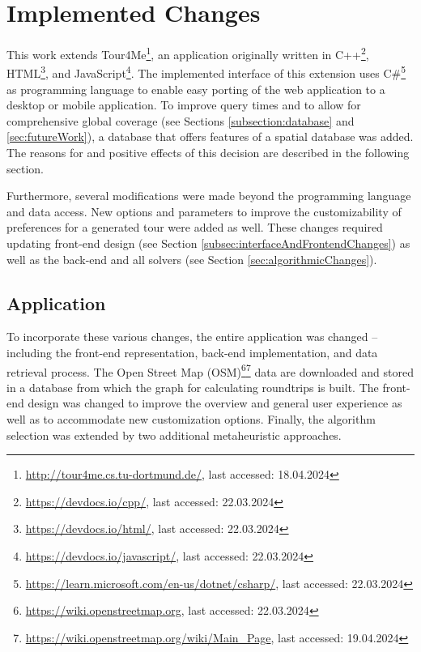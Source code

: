 \chapter{Implemented Changes}
\label{chapter:implementedChanges}

This work extends Tour4Me\footnote{\url{http://tour4me.cs.tu-dortmund.de/}, last accessed: 18.04.2024}, an application originally written in C++\footnote{\url{https://devdocs.io/cpp/}, last accessed: 22.03.2024}, HTML\footnote{\url{https://devdocs.io/html/}, last accessed: 22.03.2024}, and JavaScript\footnote{\url{https://devdocs.io/javascript/}, last accessed: 22.03.2024}. 
The implemented interface of this extension uses C\#\footnote{\url{https://learn.microsoft.com/en-us/dotnet/csharp/}, last accessed: 22.03.2024} as programming language to enable easy porting of the web application to a desktop or mobile application.
To improve query times and to allow for comprehensive global coverage (see Sections \ref{subsection:database} and \ref{sec:futureWork}), a database that offers features of a spatial database was added. 
The reasons for and positive effects of this decision are described in the following section.

Furthermore, several modifications were made beyond the programming language and data access.
New options and parameters to improve the customizability of preferences for a generated tour were added as well.
These changes required updating front-end design (see Section \ref{subsec:interfaceAndFrontendChanges}) as well as the back-end and all solvers (see Section \ref{sec:algorithmicChanges}). 


\section{Application}
\label{sec:application}

To incorporate these various changes, the entire application was changed -- including the front-end representation, back-end implementation, and data retrieval process.
The Open Street Map (OSM)\footnote{\url{https://wiki.openstreetmap.org}, last accessed: 22.03.2024}\footnote{\url{https://wiki.openstreetmap.org/wiki/Main_Page}, last accessed: 19.04.2024} data are downloaded and stored in a database from which the graph for calculating roundtrips is built.
The front-end design was changed to improve the overview and general user experience as well as to accommodate new customization options.
Finally, the algorithm selection was extended by two additional metaheuristic approaches.

